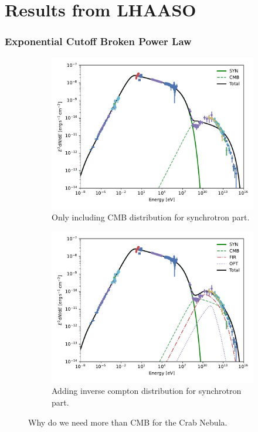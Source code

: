 \documentclass[9pt, mathserif]{beamer}
\begin{document}
    \section{Results from LHAASO}
        \begin{frame}
            \frametitle{Exponential Cutoff Broken Power Law}
            \begin{figure}[t]
                \centering
                \begin{subfigure}{0.48\linewidth}
                    \centering
                    \includegraphics[width=\linewidth]{SynIC-BestFitParCMB.pdf}
                    \caption{Only including CMB distribution for synchrotron part.}
                \end{subfigure}
                \begin{subfigure}{0.48\textwidth}
                    \centering
                    \includegraphics[width=\linewidth]{SynIC-BestFitPar1.pdf}
                    \caption{Adding inverse compton distribution for synchrotron part.}
                \end{subfigure}
                \caption{Why do we need more than CMB for the Crab Nebula.}
            \end{figure}
        \end{frame}
\end{document}
